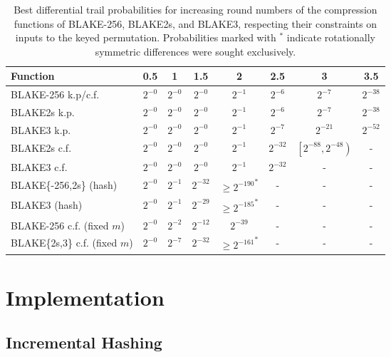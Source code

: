 \documentclass[11pt,notitlepage,a4paper]{article}
\begin{document}
\begin{table}[t]
  \centering
  \caption{Best differential trail probabilities for increasing round numbers of the compression functions of BLAKE-256, BLAKE2s, and BLAKE3, respecting their constraints on inputs to the keyed permutation. Probabilities marked with ${}^\ast$ indicate rotationally symmetric differences were sought exclusively.}%
  \label{tab:trails}
  \begin{tabular}{lccccccc}
    \toprule
    Function & 0.5   & 1     & 1.5   & 2     & 2.5   & 3     & 3.5 \\ \midrule
    BLAKE-256 k.p/c.f. & $2^{-0}$ & $2^{-0}$ & $2^{-0}$ & $2^{-1}$ & $2^{-6}$ & $2^{-7}$ & $2^{-38}$  \\
    BLAKE2s k.p. & $2^{-0}$ & $2^{-0}$ & $2^{-0}$ & $2^{-1}$ & $2^{-6}$ & $2^{-7}$ & $2^{-38}$  \\
    BLAKE3 k.p. & $2^{-0}$ & $2^{-0}$ & $2^{-0}$ & $2^{-1}$ & $2^{-7}$ & $2^{-21}$ & $2^{-52}$  \\
    BLAKE2s c.f.  &  $2^{-0}$  & $2^{-0}$ &  $2^{-0}$  & $2^{-1}$ & $2^{-32}$   & $\left[2^{-88}, 2^{-48}\right)$ & -  \\
    BLAKE3 c.f.   &  $2^{-0}$  & $2^{-0}$ &  $2^{-0}$  & $2^{-1}$ & $2^{-32}$   & - & -  \\
    BLAKE\{-256,2s\} (hash) & $2^{-0}$ & $2^{-1}$ & $2^{-32}$ & ${\ge 2^{-190}}^\ast$ & - & - & -  \\ %
    BLAKE3 (hash) & $2^{-0}$ & $2^{-1}$ & $2^{-29}$ & ${\ge 2^{-185}}^\ast$ & - & - & -  \\ %
    BLAKE-256 c.f. (fixed $m$) & $2^{-0}$ & $2^{-2}$ & $2^{-12}$ & $2^{-39}$ & - & - & - \\
    BLAKE\{2s,3\} c.f. (fixed $m$) & $2^{-0}$ & $2^{-7}$ & $2^{-32}$ & ${\ge 2^{-161}}^\ast$ & - & - & - \\ %
    \bottomrule
  \end{tabular}
\end{table}

\section{Implementation}\label{sec:implementation}

\subsection{Incremental Hashing}\label{sec:incremental}
\end{document}
